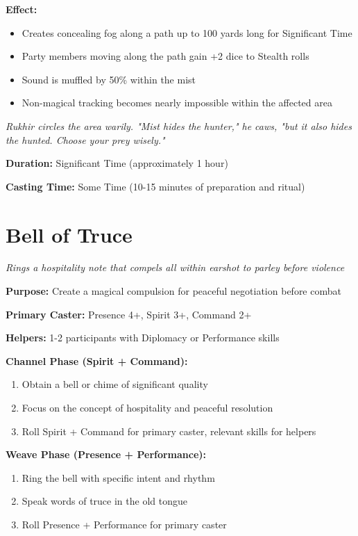 \documentclass[12pt,twoside]{book}
\newcommand{\shadow}[1]{\textit{#1}}
\begin{document}
\textbf{Effect:}
\begin{itemize}
\item Creates concealing fog along a path up to 100 yards long for Significant Time
\item Party members moving along the path gain +2 dice to Stealth rolls
\item Sound is muffled by 50\% within the mist
\item Non-magical tracking becomes nearly impossible within the affected area
\end{itemize}

\shadow{Rukhir circles the area warily. "Mist hides the hunter," he caws, "but it also hides the hunted. Choose your prey wisely."}

\textbf{Duration:} Significant Time (approximately 1 hour)

\textbf{Casting Time:} Some Time (10-15 minutes of preparation and ritual)

\section*{Bell of Truce}
\textit{Rings a hospitality note that compels all within earshot to parley before violence}

\textbf{Purpose:} Create a magical compulsion for peaceful negotiation before combat

\textbf{Primary Caster:} Presence 4+, Spirit 3+, Command 2+

\textbf{Helpers:} 1-2 participants with Diplomacy or Performance skills

\textbf{Channel Phase (Spirit + Command):}
\begin{enumerate}
\item Obtain a bell or chime of significant quality
\item Focus on the concept of hospitality and peaceful resolution
\item Roll Spirit + Command for primary caster, relevant skills for helpers
\end{enumerate}

\textbf{Weave Phase (Presence + Performance):}
\begin{enumerate}
\item Ring the bell with specific intent and rhythm
\item Speak words of truce in the old tongue
\item Roll Presence + Performance for primary caster
\end{enumerate}
\end{document}
